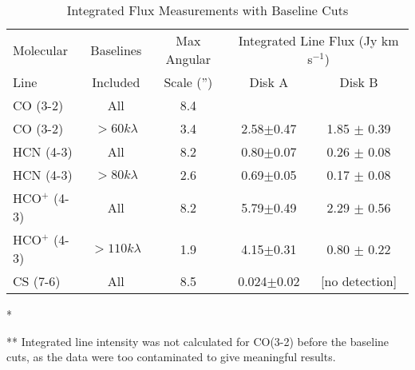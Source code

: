\begin{table}
  \begin{threeparttable}
    \centering
    \caption{Integrated Flux Measurements with Baseline Cuts}
    \label{tab:baseline_cutting_table}
    \renewcommand{\arraystretch}{1.2}
    \begin{tabular}{l | c | c | c  c }
      \toprule \toprule
      {Molecular}     & Baselines       & Max Angular & \multicolumn{2}{c}{Integrated Line Flux (Jy km s$^{-1}$)} \\
      Line            & Included        & Scale ('')  & Disk A        & Disk B \\
      \midrule %
      CO (3-2)        & All             & 8.4        & \tnote{*}      &  \tnote{*} \\
      CO (3-2)        & $>60 k\lambda$  & 3.4        & 2.58$\pm$0.47  & 1.85 $\pm$ 0.39 \\
      HCN (4-3)       & All             & 8.2        & 0.80$\pm$0.07  &  0.26 $\pm$ 0.08 \\
      HCN (4-3)       & $>80 k\lambda$  & 2.6        & 0.69$\pm$0.05  &  0.17 $\pm$ 0.08 \\
      HCO$^{+}$ (4-3) & All             & 8.2        & 5.79$\pm$0.49  &  2.29 $\pm$ 0.56 \\
      HCO$^{+}$ (4-3) & $>110 k\lambda$ & 1.9        & 4.15$\pm$0.31  &  0.80 $\pm$ 0.22 \\
      CS (7-6)        & All             & 8.5        & 0.024$\pm$0.02 & [no detection] \\
      \bottomrule
    \end{tabular}
    \begin{tablenotes}\footnotesize
      \item[*]
      \item[**] Integrated line intensity was not calculated for CO(3-2) before the baseline cuts, as the data were too contaminated to give meaningful results.
    \end{tablenotes}
  \end{threeparttable}
\end{table}








